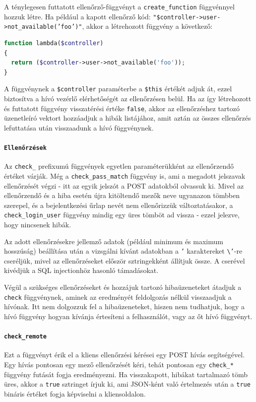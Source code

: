 \documentclass[12pt,a4paper,twoside]{article}
\begin{document}
A ténylegesen futtatott
ellenőrző-függvényt a \texttt{create\_function} függvénnyel hozzuk létre. Ha
például a kapott ellenőrző kód:
\texttt{"\$controller->user->not\_available('foo')"}, akkor a létrehozott
függvény a következő:

\begin{lstlisting}[language=PHP, numbers=none]
function lambda($controller)
{
  return ($controller->user->not_available('foo'));
}
\end{lstlisting}

A függvénynek a \texttt{\$controller} paraméterbe a \texttt{\$this} értékét
adjuk át, ezzel biztosítva a hívó vezérlő elérhetőségét az ellenőrzésen
belül. Ha az így létrehozott és futtatott függvény visszatérési értéke
\texttt{false}, akkor az ellenőrzéshez tartozó üzenetleíró vektort hozzáadjuk a
hibák listájához, amit aztán az összes ellenőrzés lefuttatása után visszaadunk a
hívó függvénynek.


\paragraph{\texttt{Ellenőrzések}}
Az \texttt{check\_} prefixumú függvények egyetlen paraméterükként az
ellenőrzendő értéket várják. Még a \texttt{check\_pass\_match} függvény is, ami
a megadott jelszavak ellenőrzését végzi - itt az egyik jelszót a POST adatokból
olvassuk ki. Mivel az ellenőrzendő és a hiba esetén újra kitöltendő mezők neve
ugyanazon tömbben szerepel, és a bejelentkezési űrlap nevét nem ellenőrizzük
változtatásakor, a \texttt{check\_login\_user} függvény mindig egy üres tömböt
ad vissza - ezzel jelezve, hogy nincsenek hibák.

Az adott ellenőrzésekre jellemző adatok (például minimum és maximum hosszúság)
beállítása után a vizsgálni kívánt adatokban a \texttt{'} karaktereket
\texttt{\textbackslash'}-re cseréljük, mivel az ellenőrzéseket először sztringekként állítjuk
össze. A cserével kivédjük a SQL injectionhöz hasonló támadásokat.

Végül a szükséges ellenőrzéseket és hozzájuk tartozó hibaüzeneteket átadjuk a
\texttt{check} függvénynek, aminek az eredményét feldolgozás nélkül visszaadjuk
a hívónak. Itt nem dolgozzuk fel a hibaüzeneteket, hiszen nem tudhatjuk, hogy a
hívó függvény hogyan kívánja értesíteni a felhasználót, vagy az őt hívó
függvényt.


\paragraph{\texttt{check\_remote}}
Ezt a függvényt érik el a kliens ellenőrzési kérései egy POST hívás
segítségével. Egy hívás pontosan egy mező ellenőrzését kéri, tehát pontosan egy
\texttt{check\_*} függvény futását fogja eredményezni. Ha visszakapott, hibákat
tartalmazó tömb üres, akkor a \texttt{true} sztringet írjuk ki, ami JSON-ként
való értelmezés után a \texttt{true} bináris értéket fogja képviselni a
kliensoldalon.
\end{document}
